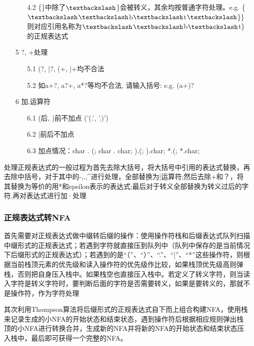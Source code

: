 \begin{itemize}
\begin{itemize}
        \item[4.2]\{\}中除了$\textbackslash$\}会被转义，其余均按普通字符处理。e.g. \{$\textbackslash$$\textbackslash$b$\textbackslash$t$\textbackslash$\}\} 则对应引用名称为$\textbackslash$$\textbackslash$b$\textbackslash$t\}的正规表达式
    \end{itemize}
    \item[5]?, +处理
    \begin{itemize}
        \item[5.1](?, |?, (+, |+均不合法
        \item[5.2]如a+?, a?+, a*?等均不合法, 请输入括号: e.g. (a+)?
    \end{itemize}
    \item[6]加.运算符
    \begin{itemize}
        \item[6.1](后, )前不加点 ('(.', '.)')
        \item[6.2]|前后不加点
        \item[6.3]加点情况：char . (; char . char; ).(; ).char; *.(; *.char;
    \end{itemize}
\end{itemize}
处理正规表达式的一般过程为首先去除大括号，将大括号中引用的表达式替换，再去除中括号，对于其中的-,.,\^{}进行处理，全部替换为|运算符;然后去除+和？，将其替换为等价的用*和epsilon表示的表达式;最后对于转义全部替换为转义过后的字符,再对表达式进行加·处理
\subsubsection{正规表达式转NFA}
首先需要对正规表达式做中缀转后缀的操作：使用操作符栈和后缀表达式队列扫描中缀形式的正规表达式；若遇到字符就直接压到队列中（队列中保存的是当前情况下后缀形式的正规表达式）；若遇到的是“（”、“）”、“.”、“|”、“*”这些操作符，则根据当前栈顶元素的优先级和读入操作符的优先级作比较，如果栈顶优先级高则弹栈，否则把自身压入栈中。如果栈空也直接压入栈中。若定义了转义字符，则当读入字符是转义字符时，要判断后面的字符是否需要转义，如果是要转义的，那就不是操作符，作为字符处理


其次利用Thompson算法将后缀形式的正规表达式自下而上组合构建NFA，使用栈来记录生成的小NFA的开始状态和结束状态，遇到操作符后根据相应规则弹出栈顶的小NFA进行转换合并，生成新的NFA并将新的NFA的开始状态和结束状态压入栈中，最后即可获得一个完整的NFA。

